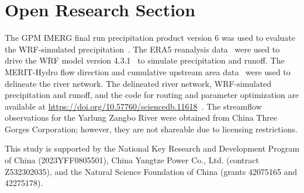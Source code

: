 \documentclass[draft]{agujournal2019}
\begin{document}
\section*{Open Research Section}

The GPM IMERG final run precipitation product version 6 was used to evaluate the WRF-simulated precipitation~\cite{huffman2019GPM}. The ERA5 reanalysis data~\cite{hersbach2020QJRMS} were used to drive the WRF model version 4.3.1~\cite{powers2017BAMS} to simulate precipitation and runoff. The MERIT-Hydro flow direction and cumulative upstream area data~\cite{yamazaki2019WRR} were used to delineate the river network. The delineated river network, WRF-simulated precipitation and runoff, and the code for routing and parameter optimization are available at \url{https://doi.org/10.57760/sciencedb.11618}~\cite{zheng2024SCB}. The streamflow observations for the Yarlung Zangbo River were obtained from China Three Gorges Corporation; however, they are not shareable due to licensing restrictions.

\acknowledgments{}

This study is supported by the National Key Research and Development Program of China (2023YFF0805501), China Yangtze Power Co., Ltd. (contract Z532302035), and the Natural Science Foundation of China (grants 42075165 and 42275178).


\end{document}
